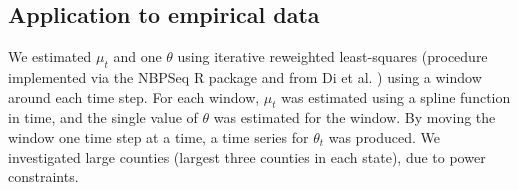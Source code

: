 \documentclass[10pt,letterpaper]{article}
\begin{document}
\subsection*{Application to empirical data}
We estimated \begin{math}\mu_t\end{math} and one \begin{math}\theta\end{math} using iterative reweighted least-squares (procedure implemented via the NBPSeq R package \cite{NBPSeq} and from Di et al. \cite{yanming_nbp_2011}) using a window around each time step.
For each window, \begin{math}\mu_t\end{math} was estimated using a spline function in time, and the single value of \begin{math}\theta\end{math} was estimated for the window. 
By moving the window one time step at a time, a time series for \begin{math}\theta_t\end{math} was produced. We investigated large counties (largest three counties in each state), due to power constraints.

\end{document}
